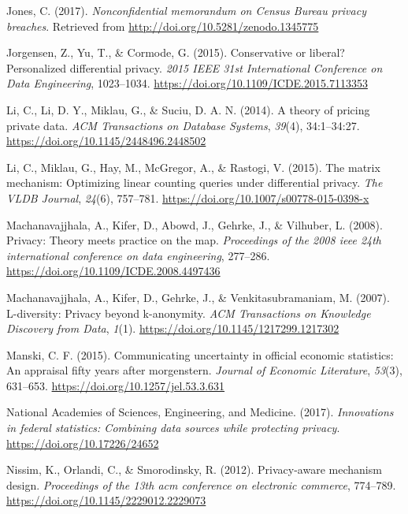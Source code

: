 \documentclass[]{article}
\begin{document}
\hypertarget{ref-jones:2017}{}
Jones, C. (2017). \emph{Nonconfidential memorandum on Census Bureau
privacy breaches}. Retrieved from
\url{http://doi.org/10.5281/zenodo.1345775}

\hypertarget{ref-jorgensen:personalized:ICDE:2015}{}
Jorgensen, Z., Yu, T., \& Cormode, G. (2015). Conservative or liberal?
Personalized differential privacy. \emph{2015 IEEE 31st International
Conference on Data Engineering}, 1023--1034.
\url{https://doi.org/10.1109/ICDE.2015.7113353}

\hypertarget{ref-Li2014}{}
Li, C., Li, D. Y., Miklau, G., \& Suciu, D. A. N. (2014). A theory of
pricing private data. \emph{ACM Transactions on Database Systems},
\emph{39}(4), 34:1--34:27. \url{https://doi.org/10.1145/2448496.2448502}

\hypertarget{ref-li:matrix:VLDB:2015}{}
Li, C., Miklau, G., Hay, M., McGregor, A., \& Rastogi, V. (2015). The
matrix mechanism: Optimizing linear counting queries under differential
privacy. \emph{The VLDB Journal}, \emph{24}(6), 757--781.
\url{https://doi.org/10.1007/s00778-015-0398-x}

\hypertarget{ref-Machanavajjhala:OTM:ICDE:2008}{}
Machanavajjhala, A., Kifer, D., Abowd, J., Gehrke, J., \& Vilhuber, L.
(2008). Privacy: Theory meets practice on the map. \emph{Proceedings of
the 2008 ieee 24th international conference on data engineering},
277--286. \url{https://doi.org/10.1109/ICDE.2008.4497436}

\hypertarget{ref-Machanavajjhala:2007:LDP:1217299.1217302}{}
Machanavajjhala, A., Kifer, D., Gehrke, J., \& Venkitasubramaniam, M.
(2007). L-diversity: Privacy beyond k-anonymity. \emph{ACM Transactions
on Knowledge Discovery from Data}, \emph{1}(1).
\url{https://doi.org/10.1145/1217299.1217302}

\hypertarget{ref-Manski2014}{}
Manski, C. F. (2015). Communicating uncertainty in official economic
statistics: An appraisal fifty years after morgenstern. \emph{Journal of
Economic Literature}, \emph{53}(3), 631--653.
\url{https://doi.org/10.1257/jel.53.3.631}

\hypertarget{ref-groves:harris-kojetin:2017}{}
National Academies of Sciences, Engineering, and Medicine. (2017).
\emph{Innovations in federal statistics: Combining data sources while
protecting privacy}. \url{https://doi.org/10.17226/24652}

\hypertarget{ref-Nissim:2012:PMD:2229012.2229073}{}
Nissim, K., Orlandi, C., \& Smorodinsky, R. (2012). Privacy-aware
mechanism design. \emph{Proceedings of the 13th acm conference on
electronic commerce}, 774--789.
\url{https://doi.org/10.1145/2229012.2229073}
\end{document}

